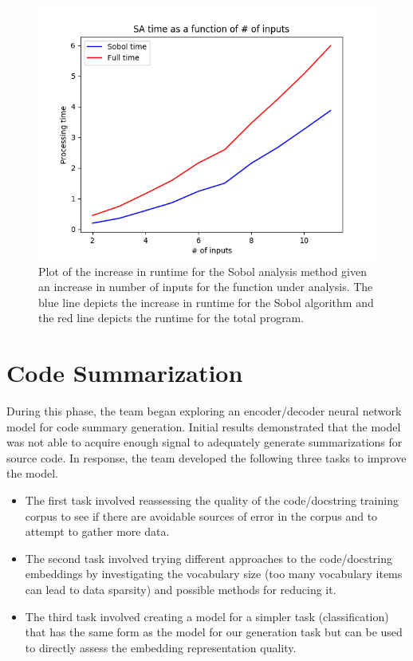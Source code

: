 \documentclass[article, 12pt, oneside]{memoir}
\begin{document}

\begin{figure}
\centering
\includegraphics{figs/sa_inputs_vs_runtime.png}
\caption{Plot of the increase in runtime for the Sobol analysis method
given an increase in number of inputs for the function under analysis.
The blue line depicts the increase in runtime for the Sobol algorithm
and the red line depicts the runtime for the total program.\label{fig:sa_inputs}}
\end{figure}


\hypertarget{code-summarization}{%
\section{Code Summarization}\label{code-summarization}}

During this phase, the team began exploring an encoder/decoder
neural network model for code summary generation. Initial results
demonstrated that the model was not able to acquire enough signal to
adequately generate summarizations for source code. In
response, the team developed the following three tasks to improve the
model.

\begin{itemize}
\item
  The first task involved reassessing the quality of the code/docstring
  training corpus to see if there are avoidable sources of error in the
  corpus and to attempt to gather more data.
\item
  The second task involved trying different approaches to the
  code/docstring embeddings by investigating the vocabulary size (too
  many vocabulary items can lead to data sparsity) and possible methods
  for reducing it.
\item
  The third task involved creating a model for a simpler task
  (classification) that has the same form as the model for our
  generation task but can be used to directly assess the embedding
  representation quality.
\end{itemize}
\end{document}
